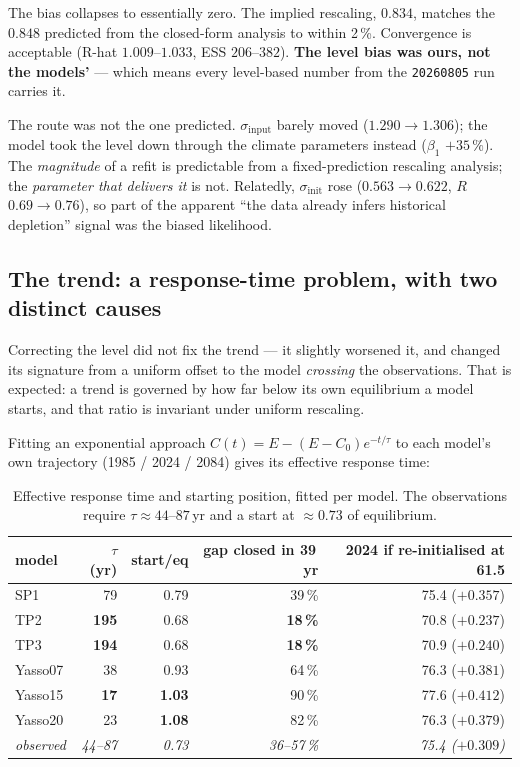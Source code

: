 \documentclass[11pt]{article}
\newcommand{\sinit}{\sigma_{\mathrm{init}}}
\newcommand{\sinput}{\sigma_{\mathrm{input}}}
\begin{document}
\noindent The bias collapses to essentially zero. The implied rescaling, $0.834$, matches the
$0.848$ predicted from the closed-form analysis to within 2\,\%. Convergence is acceptable
(R-hat $1.009$--$1.033$, ESS $206$--$382$). \textbf{The level bias was ours, not the models'} ---
which means every level-based number from the \texttt{20260805} run carries it.

\begin{caveat}
The route was not the one predicted. $\sinput$ barely moved ($1.290 \rightarrow 1.306$); the model
took the level down through the climate parameters instead ($\beta_1$ $+35\,\%$). The
\emph{magnitude} of a refit is predictable from a fixed-prediction rescaling analysis; the
\emph{parameter that delivers it} is not. Relatedly, $\sinit$ rose ($0.563 \rightarrow 0.622$,
$R$ $0.69 \rightarrow 0.76$), so part of the apparent ``the data already infers historical
depletion'' signal was the biased likelihood.
\end{caveat}

\subsection{The trend: a response-time problem, with two distinct causes}

Correcting the level did not fix the trend --- it slightly worsened it, and changed its
signature from a uniform offset to the model \emph{crossing} the observations. That is expected:
a trend is governed by how far below its own equilibrium a model starts, and that ratio is
invariant under uniform rescaling.

Fitting an exponential approach $C(t) = E - (E-C_0)e^{-t/\tau}$ to each model's own trajectory
(1985 / 2024 / 2084) gives its effective response time:

\begin{table}[H]\centering\small
\caption{Effective response time and starting position, fitted per model. The observations
require $\tau \approx 44$--$87$\,yr and a start at $\approx 0.73$ of equilibrium.}
\begin{tabular}{lrrrr}
\toprule
model & $\tau$ (yr) & start/eq & gap closed in 39\,yr & 2024 if re-initialised at 61.5\\
\midrule
SP1     & 79  & 0.79 & 39\,\% & 75.4 \quad($+0.357$)\\
TP2     & \textbf{195} & 0.68 & \textbf{18\,\%} & 70.8 \quad($+0.237$)\\
TP3     & \textbf{194} & 0.68 & \textbf{18\,\%} & 70.9 \quad($+0.240$)\\
Yasso07 & 38  & 0.93 & 64\,\% & 76.3 \quad($+0.381$)\\
Yasso15 & \textbf{17}  & \textbf{1.03} & 90\,\% & 77.6 \quad($+0.412$)\\
Yasso20 & 23  & \textbf{1.08} & 82\,\% & 76.3 \quad($+0.379$)\\
\midrule
\emph{observed} & \emph{44--87} & \emph{0.73} & \emph{36--57\,\%} & \emph{75.4 \quad($+0.309$)}\\
\bottomrule
\end{tabular}
\end{table}
\end{document}
